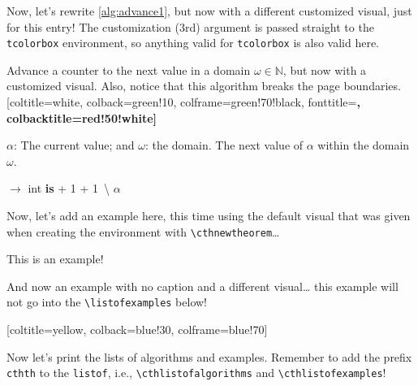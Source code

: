 \documentclass{article}
\begin{document}
Now, let's rewrite \autoref{alg:advance1}, but now with a different customized visual, just for this entry!  The customization (3rd) argument is passed straight to the \texttt{tcolorbox} environment, so anything valid for \texttt{tcolorbox} is also valid here.

\begin{cthalgorithm}{Advance a counter to the next value in a domain $\omega \in \mathbb{N}$, but now with a customized visual. Also, notice that this algorithm breaks the page boundaries.}[coltitle=white, colback=green!10, colframe=green!70!black, fonttitle=\sffamily\bfseries\large, colbacktitle=red!50!white]
  \label{alg:advance2}
\begin{algorithmic}[1]
  \Statex \Input $\alpha$: The current value; and $\omega$: the domain.
  \Statex \Output The next value of $\alpha$ within the domain $\omega$.

  \Vspace

   $\rightarrow$ int \textbf{is}
    \Let {\alpha} {\alpha + 1}
    \While{$\alpha \not\in \omega \And \omega \neq \bracesemptyset$}
      \Let {\alpha} {\alpha + 1}
    \EndWhile
    \If{$\omega \neq \bracesemptyset$}
      \Let {\omega} {\omega \,\backslash \lbrace \alpha \rbrace}
    \EndIf
    \State \Return $\alpha$
  \EndFunction
\end{algorithmic}
\end{cthalgorithm}

Now, let's add an example here, this time using the default visual that was given when creating the environment with \verb+\cthnewtheorem+…

\begin{cthexample}{This is an example!}
  \emph{\kant[3]}
\end{cthexample}

And now an example with no caption and a different visual…  this example will not go into the \verb+\listofexamples+ below!

\begin{cthexample}{}[coltitle=yellow, colback=blue!30, colframe=blue!70]
  \emph{\kant[4]}
\end{cthexample}

Now let's print the lists of algorithms and examples. Remember to add the prefix \texttt{cthth} to the \texttt{listof}, i.e., \verb+\cthlistofalgorithms+ and \verb+\cthlistofexamples+!

\cthlistofalgorithms

\cthlistofexamples
\end{document}
